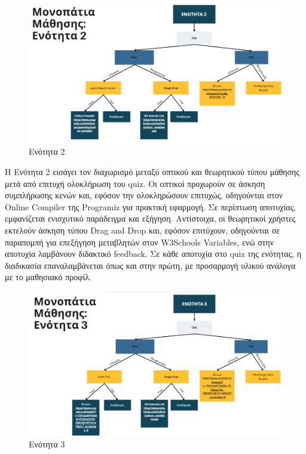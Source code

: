 \documentclass[11pt]{report}
\begin{document}
\begin{figure}[H]
    \centering
    \includegraphics[width=0.9\linewidth]{Figures/image007.png}
    \caption{Ενότητα 2}
    \label{fig:enter-label}
\end{figure}

Η Ενότητα 2 εισάγει τον διαχωρισμό μεταξύ οπτικού και θεωρητικού τύπου μάθησης μετά από επιτυχή ολοκλήρωση του quiz. Οι οπτικοί προχωρούν σε άσκηση συμπλήρωσης κενών και, εφόσον την ολοκληρώσουν επιτυχώς, οδηγούνται στον Online Compiler της Programiz για πρακτική εφαρμογή. Σε περίπτωση αποτυχίας, εμφανίζεται ενισχυτικό παράδειγμα και εξήγηση. Αντίστοιχα, οι θεωρητικοί χρήστες εκτελούν άσκηση τύπου Drag and Drop και, εφόσον επιτύχουν, οδηγούνται σε παραπομπή για επεξήγηση μεταβλητών στον W3Schools Variables, ενώ στην αποτυχία λαμβάνουν διδακτικό feedback. Σε κάθε αποτυχία στο quiz της ενότητας, η διαδικασία επαναλαμβάνεται όπως και στην πρώτη, με προσαρμογή υλικού ανάλογα με το μαθησιακό προφίλ. 

\begin{figure}[H]
    \centering
    \includegraphics[width=0.9\linewidth]{Figures/image008.png}
    \caption{Ενότητα 3}
    \label{fig:enter-label}
\end{figure}
\end{document}
